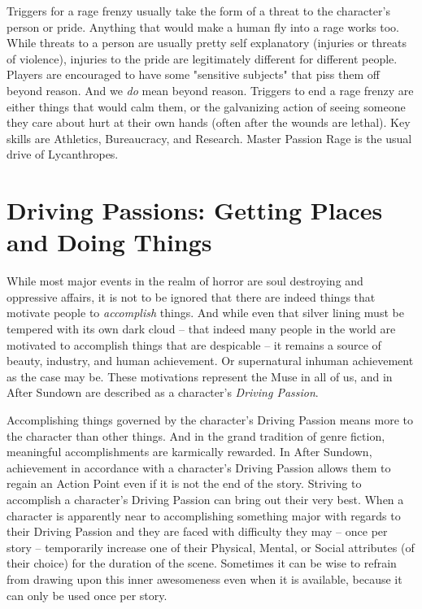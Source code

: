 Triggers for a rage frenzy usually take the form of a threat to the character's person or  pride. Anything that would make a human fly into a rage works too. While threats to a person are usually pretty self explanatory (injuries or threats of violence), injuries to the pride are legitimately different for different people. Players are encouraged to have some "sensitive subjects" that piss them off beyond reason. And we \textit{do} mean beyond reason. Triggers to end a rage frenzy are either things that would calm them, or the galvanizing action of seeing someone they care about hurt at their own hands (often after the wounds are lethal). Key skills are Athletics, Bureaucracy, and Research. Master Passion Rage is the usual drive of Lycanthropes.

\section[Driving Passions]{Driving Passions: Getting Places and Doing Things}

While most major events in the realm of horror are soul destroying and oppressive affairs, it is not to be ignored that there are indeed things that motivate people to \textit{accomplish} things. And while even that silver lining must be tempered with its own dark cloud -- that indeed many people in the world are motivated to accomplish things that are despicable -- it remains a source of beauty, industry, and human achievement. Or supernatural inhuman achievement as the case may be. These motivations represent the Muse in all of us, and in After Sundown are described as a character's \textit{Driving Passion}.

Accomplishing things governed by the character's Driving Passion means more to the character than other things. And in the grand tradition of genre fiction, meaningful accomplishments are karmically rewarded. In After Sundown, achievement in accordance with a character's Driving Passion allows them to regain an Action Point even if it is not the end of the story. Striving to accomplish a character's Driving Passion can bring out their very best. When a character is apparently near to accomplishing something major with regards to their Driving Passion and they are faced with difficulty they may -- once per story -- temporarily increase one of their Physical, Mental, or Social attributes (of their choice) for the duration of the scene. Sometimes it can be wise to refrain from drawing upon this inner awesomeness even when it is available, because it can only be used once per story.

